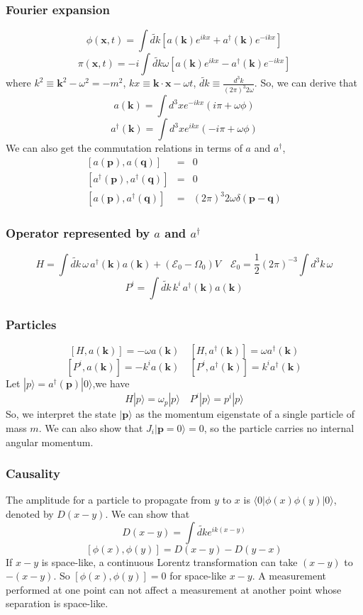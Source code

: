 \subsubsection{Fourier expansion}
\[\phi(\bm{x},t) = \int \widetilde{dk} \left[ a(\bm{k})e^{ikx} + a^{\dagger}(\bm{k})e^{-ikx} \right]\]
\[\pi(\bm{x},t) = -i \int  \widetilde{dk} \omega \left[ a(\bm{k})e^{ikx} - a^{\dagger}(\bm{k})e^{-ikx} \right]\]
where $k^2 \equiv \bm{k}^2 - \omega^2 = -m^2$, $kx \equiv \bm{k}\cdot \bm{x} - \omega t$, $\widetilde{dk} \equiv \frac{d^3k}{(2\pi)^3 2\omega}$. 
So, we can derive that
\[a(\bm{k}) = \int d^3 x e^{-ikx}(i\pi+\omega \phi)\]
\[a^{\dagger}(\bm{k}) = \int d^3 x e^{ikx}(-i\pi+\omega \phi)\]
We can also get the commutation relations in terms of $a$ and $a^{\dagger}$,
\begin{eqnarray}
\left[a(\bm{p}),a(\bm{q})\right] &=& 0 \nonumber \\
\left[a^{\dagger}(\bm{p}),a^{\dagger}(\bm{q})\right] &=& 0 \nonumber \\
\left[a(\bm{p}),a^{\dagger}(\bm{q})\right] &=& (2\pi)^3 2\omega \delta(\bm{p}-\bm{q}) \nonumber
\end{eqnarray}

\subsubsection{Operator represented by $a$ and $a^{\dagger}$}
\[H=\int \widetilde{dk}\, \omega\, a^{\dagger}(\bm{k})a(\bm{k}) + (\mathcal{E}_0 - \Omega_0)V \quad \mathcal{E}_0 = \frac{1}{2}(2\pi)^{-3}\int d^3 k \,\omega\]
\[P^{i}=\int \widetilde{dk}\, k^{i}\, a^{\dagger}(\bm{k})a(\bm{k}) \]

\subsubsection{Particles}
\[[H,a(\bm{k})] = -\omega a(\bm{k}) \quad [H,a^{\dagger}(\bm{k})] = \omega a^{\dagger}(\bm{k})\]
\[[P^i,a(\bm{k})] = -k^i a(\bm{k}) \quad [P^i,a^{\dagger}(\bm{k})] = k^i a^{\dagger}(\bm{k})\]
Let $|p\rangle = a^{\dagger}(\bm{p})|0\rangle $,we have
\[H |p\rangle = \omega_p|p\rangle \quad P^i |p\rangle = p^i|p\rangle\]
So, we interpret the state $|\bm{p}\rangle$ as the momentum eigenstate of a single particle of mass $m$. We can also show that 
$J_i|\bm{p} = 0\rangle = 0$, so the particle carries no internal angular momentum.

\subsubsection{Causality}
\noindent
The amplitude for a particle to propagate from $y$ to $x$ is $\langle 0 | \phi(x) \phi(y) | 0 \rangle$, denoted by $D(x-y)$.
We can show that
\[D(x-y) = \int \widetilde{dk} e^{ik(x-y)}\]
\[[\phi(x),\phi(y)] = D(x-y) -D(y-x)\]
If $x-y$ is space-like, a continuous Lorentz transformation can take $(x-y)$ to $-(x-y)$. So $[\phi(x),\phi(y)] =0$ for space-like $x-y$. A measurement performed at one point can not affect a measurement at another point whose separation is space-like.
